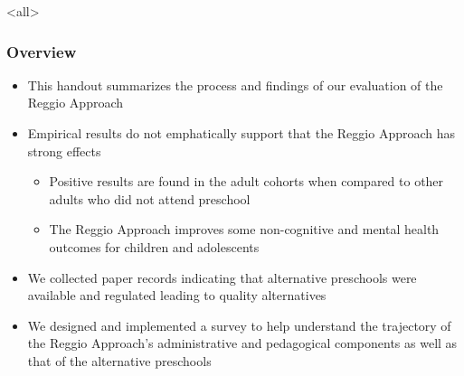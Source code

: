 \documentclass[static]{JJH-Beamer_PAGENOS}
\begin{document}

\mode<all>{\theTitlePages} %

\begin{frame}
\frametitle{Overview}
\begin{itemize}
\item This handout summarizes the process and findings of our evaluation of the Reggio Approach
\item Empirical results do not emphatically support that the Reggio Approach has strong effects
\begin{itemize}
	\item Positive results are found in the adult cohorts when compared to other adults who did not attend preschool
	\item The Reggio Approach improves some non-cognitive and mental health outcomes for children and adolescents
\end{itemize}
\item We collected paper records indicating that alternative preschools were available and regulated leading to quality alternatives
\item We designed and implemented a survey to help understand the trajectory of the Reggio Approach's administrative and pedagogical components as well as that of the alternative preschools
\end{itemize}

\end{frame}

\end{document}
